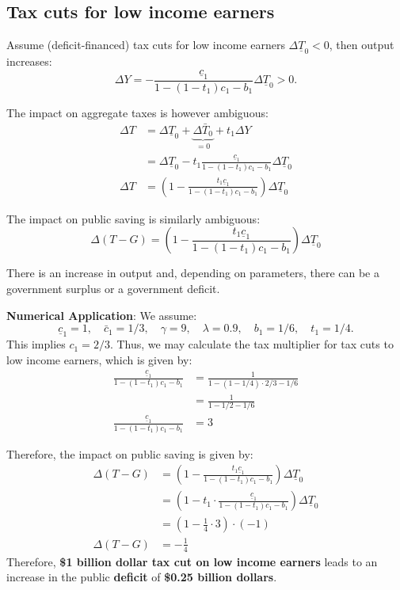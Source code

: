 \documentclass[]{book}
\begin{document}
\subsection{Tax cuts for low income
earners}\label{tax-cuts-for-low-income-earners}

Assume (deficit-financed) tax cuts for low income earners
\(\Delta\underline{T}_{0}<0\), then output increases:
\[\Delta Y=-\frac{\underline{c}_{1}}{1-\left(1-t_{1}\right)c_{1}-b_{1}}\Delta\underline{T}_{0}>0.\]

The impact on aggregate taxes is however ambiguous: \[
\begin{aligned}
\Delta T    &=\Delta\underline{T}_{0}+\underbrace{\Delta\bar{T}_{0}}_{=0}+t_1\Delta Y\\
&=\Delta\underline{T}_{0}-t_1 \frac{\underline{c}_{1}}{1-\left(1-t_{1}\right)c_{1}-b_{1}}\Delta\underline{T}_{0}\\
\Delta T    &=\left(1-\frac{t_1\underline{c}_{1}}{1-\left(1-t_{1}\right)c_{1}-b_{1}}\right)\Delta\underline{T}_{0}
\end{aligned}
\]

The impact on public saving is similarly ambiguous:
\[\Delta\left(T-G\right)=\left(1-\frac{t_1\underline{c}_{1}}{1-\left(1-t_{1}\right)c_{1}-b_{1}}\right)\Delta\underline{T}_{0}\]

There is an increase in output and, depending on parameters, there can
be a government surplus or a government deficit.

\textbf{Numerical Application}: We assume:
\[\underline{c}_{1}=1, \quad \bar{c}_{1}=1/3,\quad \gamma=9, \quad\lambda=0.9,\quad b_1=1/6, \quad t_1=1/4.\]
This implies \(c_1=2/3.\) Thus, we may calculate the tax multiplier for
tax cuts to low income earners, which is given by: \[
\begin{aligned}
\frac{\underline{c}_{1}}{1-(1-t_1)c_{1}-b_{1}} &= \frac{1}{1-(1-1/4) \cdot 2/3-1/6}\\
&= \frac{1}{1-1/2-1/6}\\
\frac{\underline{c}_{1}}{1-(1-t_1)c_{1}-b_{1}} &=3
\end{aligned}
\]

Therefore, the impact on public saving is given by: \[
\begin{aligned}
\Delta\left(T-G\right)&=\left(1-\frac{t_1\underline{c}_{1}}{1-\left(1-t_{1}\right)c_{1}-b_{1}}\right)\Delta\underline{T}_{0}\\
&=\left(1-t_1 \cdot \frac{\underline{c}_{1}}{1-\left(1-t_{1}\right)c_{1}-b_{1}}\right)\Delta\underline{T}_{0}\\
&=\left(1-\frac{1}{4} \cdot 3\right) \cdot (-1)\\
\Delta\left(T-G\right)&=-\frac{1}{4}
\end{aligned}
\] Therefore, \textbf{\$1 billion dollar tax cut on low income earners}
leads to an increase in the public \textbf{deficit} of \textbf{\$0.25
billion dollars}.
\end{document}
